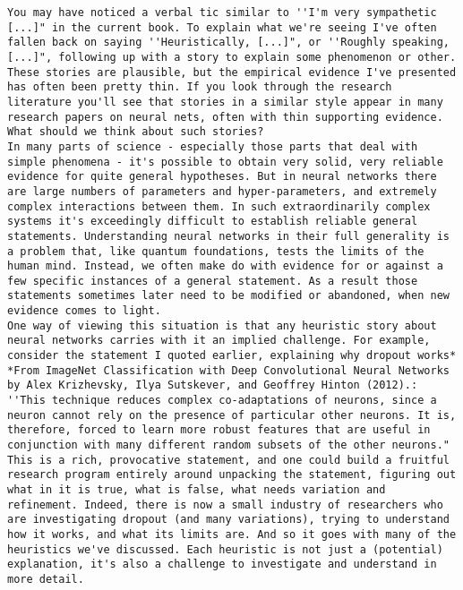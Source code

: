 \begin{lstlisting}
You may have noticed a verbal tic similar to ''I'm very sympathetic [...]" in the current book. To explain what we're seeing I've often fallen back on saying ''Heuristically, [...]", or ''Roughly speaking, [...]", following up with a story to explain some phenomenon or other. These stories are plausible, but the empirical evidence I've presented has often been pretty thin. If you look through the research literature you'll see that stories in a similar style appear in many research papers on neural nets, often with thin supporting evidence. What should we think about such stories?
In many parts of science - especially those parts that deal with simple phenomena - it's possible to obtain very solid, very reliable evidence for quite general hypotheses. But in neural networks there are large numbers of parameters and hyper-parameters, and extremely complex interactions between them. In such extraordinarily complex systems it's exceedingly difficult to establish reliable general statements. Understanding neural networks in their full generality is a problem that, like quantum foundations, tests the limits of the human mind. Instead, we often make do with evidence for or against a few specific instances of a general statement. As a result those statements sometimes later need to be modified or abandoned, when new evidence comes to light.
One way of viewing this situation is that any heuristic story about neural networks carries with it an implied challenge. For example, consider the statement I quoted earlier, explaining why dropout works* *From ImageNet Classification with Deep Convolutional Neural Networks by Alex Krizhevsky, Ilya Sutskever, and Geoffrey Hinton (2012).: ''This technique reduces complex co-adaptations of neurons, since a neuron cannot rely on the presence of particular other neurons. It is, therefore, forced to learn more robust features that are useful in conjunction with many different random subsets of the other neurons." This is a rich, provocative statement, and one could build a fruitful research program entirely around unpacking the statement, figuring out what in it is true, what is false, what needs variation and refinement. Indeed, there is now a small industry of researchers who are investigating dropout (and many variations), trying to understand how it works, and what its limits are. And so it goes with many of the heuristics we've discussed. Each heuristic is not just a (potential) explanation, it's also a challenge to investigate and understand in more detail.

\end{lstlisting}
